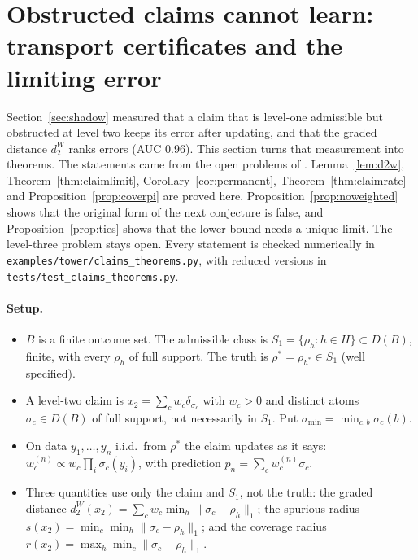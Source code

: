 \section{Obstructed claims cannot learn: transport certificates and the limiting error}\label{sec:claimlearn}
Section~\ref{sec:shadow} measured that a claim that is level-one admissible but obstructed at level two keeps its error after updating, and that the graded distance $d_2^W$ ranks errors (AUC $0.96$). This section turns that measurement into theorems. The statements came from the open problems of \cite{awasthiT}. Lemma~\ref{lem:d2w}, Theorem~\ref{thm:claimlimit}, Corollary~\ref{cor:permanent}, Theorem~\ref{thm:claimrate} and Proposition~\ref{prop:coverpi} are proved here. Proposition~\ref{prop:noweighted} shows that the original form of the next conjecture is false, and Proposition~\ref{prop:ties} shows that the lower bound needs a unique limit. The level-three problem stays open. Every statement is checked numerically in \texttt{examples/tower/claims\_theorems.py}, with reduced versions in \texttt{tests/test\_claims\_theorems.py}.

\paragraph{Setup.}
\begin{itemize}
  \item $B$ is a finite outcome set. The admissible class is $S_1=\{\rho_h:h\in H\}\subset D(B)$, finite, with every $\rho_h$ of full support. The truth is $\rho^*=\rho_{h^*}\in S_1$ (well specified).
  \item A level-two claim is $x_2=\sum_cw_c\delta_{\sigma_c}$ with $w_c>0$ and distinct atoms $\sigma_c\in D(B)$ of full support, not necessarily in $S_1$. Put $\sigma_{\min}=\min_{c,b}\sigma_c(b)$.
  \item On data $y_1,\dots,y_n$ i.i.d.\ from $\rho^*$ the claim updates as it says: $w^{(n)}_c\propto w_c\prod_i\sigma_c(y_i)$, with prediction $p_n=\sum_cw^{(n)}_c\sigma_c$.
  \item Three quantities use only the claim and $S_1$, not the truth: the graded distance $d_2^W(x_2)=\sum_cw_c\min_h\|\sigma_c-\rho_h\|_1$; the spurious radius $s(x_2)=\min_c\min_h\|\sigma_c-\rho_h\|_1$; and the coverage radius $r(x_2)=\max_h\min_c\|\sigma_c-\rho_h\|_1$.
\end{itemize}

